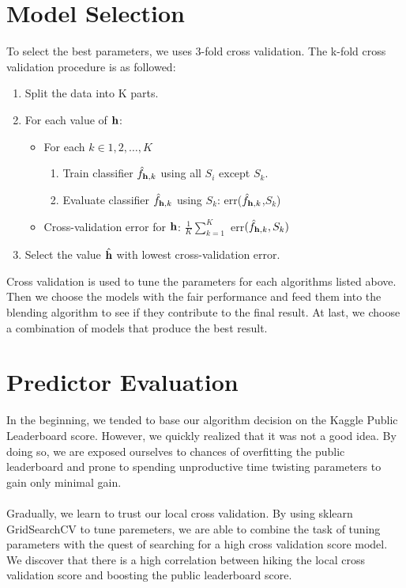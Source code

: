 \documentclass[conference]{IEEEtran}
\begin{document}
\section{Model Selection}
To select the best parameters, we uses 3-fold cross validation. The k-fold cross validation procedure is as followed:
\begin{enumerate}
\item Split the data into K parts.
\item For each value of \(\mathbf{h}\): 
\begin{itemize}
\item For each \(k \in {1,2,\dots,K}\)
\begin{enumerate}
\item Train classifier \(\hat{f}_{\mathbf{h},k}\) using all $S_i$ except $S_k$.
\item Evaluate classifier \(\hat{f}_{\mathbf{h},k}\) using $S_k$: err(\(\hat{f}_{\mathbf{h},k}\),$S_k$)
\end{enumerate}
\item Cross-validation error for $\mathbf{h}$: \(\frac{1}{K}\sum_{k=1}^K\) err\((\hat{f}_{\mathbf{h},k},S_k)\)
\end{itemize}
\item Select the value \(\hat{\mathbf{h}}\) with lowest cross-validation error.
\end{enumerate}
\indent Cross validation is used to tune the parameters for each algorithms listed above. Then we choose the models with the fair performance and feed them into the blending algorithm to see if they contribute to the final result. At last, we choose a combination of models that produce the best result. 

\section{Predictor Evaluation}
In the beginning, we tended to base our algorithm decision on the Kaggle Public Leaderboard score. However, we quickly realized that it was not a good idea. By doing so, we are exposed ourselves to chances of overfitting the public leaderboard and prone to spending unproductive time twisting parameters to gain only minimal gain. \\ \\
Gradually, we learn to trust our local cross validation. By using sklearn GridSearchCV to tune paremeters, we are able to combine the task of tuning parameters with the quest of searching for a high cross validation score model. We discover that there is a high correlation between hiking the local cross validation score and boosting the public leaderboard score.
\end{document}
